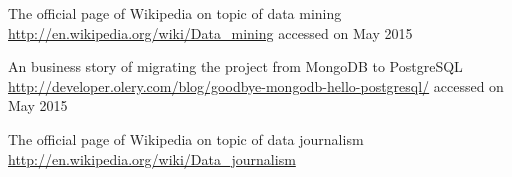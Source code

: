 \begin{thebibliography}{99999}
\singlespace\normalsize

 The official page of Wikipedia on topic of data mining \url{http://en.wikipedia.org/wiki/Data_mining} accessed on May 2015

 An business story of migrating the project from MongoDB to PostgreSQL \url{http://developer.olery.com/blog/goodbye-mongodb-hello-postgresql/} accessed on May 2015

 The official page of Wikipedia on topic of data journalism \url{http://en.wikipedia.org/wiki/Data_journalism}



\end{thebibliography}
